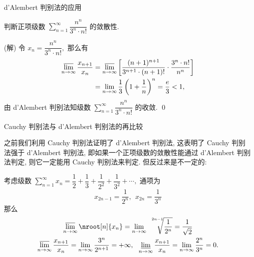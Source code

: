 
\begin{frame}{d'Alembert 判别法的应用}

\begin{eg}
\begin{center}
判断正项级数 $\sum\limits_{n=1}^\infty \dfrac{n^n}{3^n\cdot n!}$ 的敛散性.
\end{center}
\end{eg}

\pause
\vspace{1em}

\startproof[bg=yellow, fg=red](解)
令 $x_n = \dfrac{n^n}{3^n\cdot n!},$ 那么有
\begin{align*}
\varlimsup_{n\to\infty} \dfrac{x_{n+1}}{x_n} & = \varlimsup_{n\to\infty} \left[ \dfrac{(n+1)^{n+1}}{3^{n+1}\cdot (n+1)!} \cdot \dfrac{3^n\cdot n!}{n^n} \right] \\
& = \lim_{n\to\infty} \dfrac{1}{3} \left( 1 + \dfrac{1}{n} \right)^n = \dfrac{e}{3} < 1,
\end{align*}
由 d'Alembert 判别法知级数 $\sum\limits_{n=1}^\infty \dfrac{n^n}{3^n\cdot n!}$ 的收敛.
\qed

\end{frame}


\begin{frame}{Cauchy 判别法与 d'Alembert 判别法的再比较}

之前我们利用 Cauchy 判别法证明了 d'Alembert 判别法, 这表明了 Cauchy 判别法强于 d'Alembert 判别法, 即如果一个正项级数的敛散性能通过 d'Alembert 判别法判定, 则它一定能用 Cauchy 判别法来判定. 但反过来是不一定的:

\pause
\vspace{0.5em}

\begin{eg}
考虑级数 $\sum\limits_{n=1}^\infty x_n = \dfrac{1}{2} + \dfrac{1}{3} + \dfrac{1}{2^2} + \dfrac{1}{3^2} + \cdots,$ 通项为
\vspace{-1em}
\[x_{2n-1} = \dfrac{1}{2^n}, ~~ x_{2n} = \dfrac{1}{3^n}\]
那么
\begin{gather*}
\varlimsup_{n\to\infty} \nroot[n]{x_n} = \lim_{n\to\infty} \sqrt[\leftroot{-6}\uproot{13}2n-1]{\frac{1}{2^n}} = \dfrac{1}{\sqrt{2}} \\
\varlimsup_{n\to\infty} \dfrac{x_{n+1}}{x_n} = \lim_{n\to\infty} \dfrac{3^n}{2^{n+1}} = +\infty, ~~ \varliminf_{n\to\infty} \dfrac{x_{n+1}}{x_n} = \lim_{n\to\infty} \dfrac{2^n}{3^n} = 0.
\end{gather*}
\end{eg}

\end{frame}

